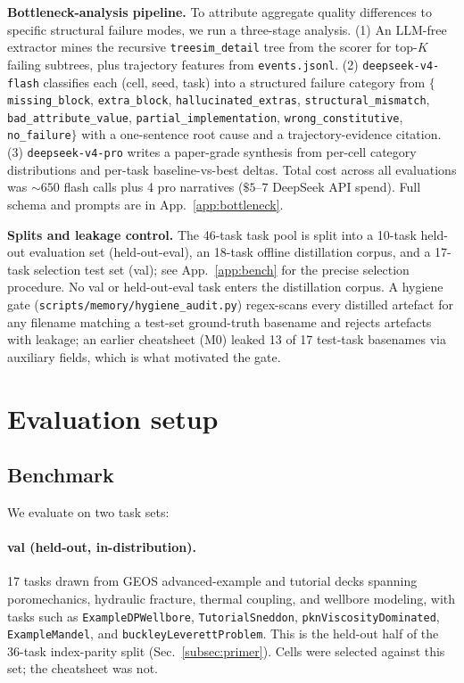 \documentclass{article}
\begin{document}
\textbf{Bottleneck-analysis pipeline.} To attribute aggregate quality differences to specific structural failure modes, we run a three-stage analysis. (1) An LLM-free extractor mines the recursive \texttt{treesim\_detail} tree from the scorer for top-$K$ failing subtrees, plus trajectory features from \texttt{events.jsonl}. (2) \texttt{deepseek-v4-flash} classifies each (cell, seed, task) into a structured failure category from $\{$\texttt{missing\_block}, \texttt{extra\_block}, \texttt{hallucinated\_extras}, \texttt{structural\_mismatch}, \texttt{bad\_attribute\_value}, \texttt{partial\_implementation}, \texttt{wrong\_constitutive}, \texttt{no\_failure}$\}$ with a one-sentence root cause and a trajectory-evidence citation. (3) \texttt{deepseek-v4-pro} writes a paper-grade synthesis from per-cell category distributions and per-task baseline-vs-best deltas. Total cost across all evaluations was ${\sim}650$ flash calls plus 4 pro narratives ($\$5\text{--}7$ DeepSeek API spend). Full schema and prompts are in App.~\ref{app:bottleneck}.

\textbf{Splits and leakage control.} The 46-task task pool is split into a 10-task held-out evaluation set (held-out-eval), an 18-task offline distillation corpus, and a 17-task selection test set (val); see App.~\ref{app:bench} for the precise selection procedure. No val or held-out-eval task enters the distillation corpus. A hygiene gate (\texttt{scripts/memory/hygiene\_audit.py}) regex-scans every distilled artefact for any filename matching a test-set ground-truth basename and rejects artefacts with leakage; an earlier cheatsheet (M0) leaked 13 of 17 test-task basenames via auxiliary fields, which is what motivated the gate.


\section{Evaluation setup}
\label{sec:eval}

\subsection{Benchmark}
\label{subsec:bench-summary}

We evaluate on two task sets:

\paragraph{val (held-out, in-distribution).} 17 tasks drawn from GEOS advanced-example and tutorial decks spanning poromechanics, hydraulic fracture, thermal coupling, and wellbore modeling, with tasks such as \texttt{ExampleDPWellbore}, \texttt{TutorialSneddon}, \texttt{pknViscosityDominated}, \texttt{ExampleMandel}, and \texttt{buckleyLeverettProblem}. This is the held-out half of the 36-task index-parity split (Sec.~\ref{subsec:primer}). Cells were selected against this set; the cheatsheet was not.
\end{document}
